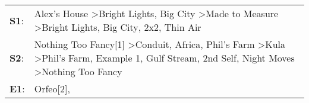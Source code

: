 \begin{supertabular}{p{0.03\textwidth}p{0.92\textwidth}}
 \textbf{S1}:  &                                                                                                                                                                                              Alex's House\textsuperscript{} \textgreater \enspace Bright Lights, Big City\textsuperscript{} \textgreater \enspace Made to Measure\textsuperscript{} \textgreater \enspace Bright Lights, Big City\textsuperscript{}, \enspace 2x2\textsuperscript{}, \enspace Thin Air\textsuperscript{}  \enspace  \\
 \textbf{S2}:  &  Nothing Too Fancy[1]\textsuperscript{} \textgreater \enspace Conduit\textsuperscript{}, \enspace Africa\textsuperscript{}, \enspace Phil's Farm\textsuperscript{} \textgreater \enspace Kula\textsuperscript{} \textgreater \enspace Phil's Farm\textsuperscript{}, \enspace Example 1\textsuperscript{}, \enspace Gulf Stream\textsuperscript{}, \enspace 2nd Self\textsuperscript{}, \enspace Night Moves\textsuperscript{} \textgreater \enspace Nothing Too Fancy\textsuperscript{}  \enspace  \\
 \textbf{E1}:  &                                                                                                                                                                                                                                                                                                                                                                                                                              Orfeo[2]\textsuperscript{}, \textsuperscript{}  \enspace  \\
\end{supertabular}
